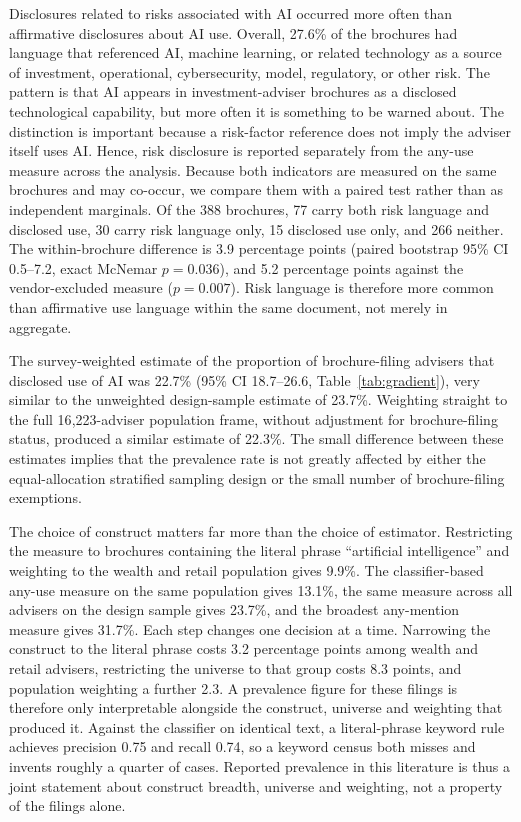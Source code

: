 \documentclass[utf8]{FrontiersinHarvard}
\begin{document}
Disclosures related to risks associated with AI occurred more often than affirmative disclosures about AI use. Overall, 27.6\% of the brochures had language that referenced AI, machine learning, or related technology as a source of investment, operational, cybersecurity, model, regulatory, or other risk. The pattern is that AI appears in investment-adviser brochures as a disclosed technological capability, but more often it is something to be warned about. The distinction is important because a risk-factor reference does not imply the adviser itself uses AI. Hence, risk disclosure is reported separately from the any-use measure across the analysis. Because both indicators are measured on the same brochures and may co-occur, we compare them with a paired test rather than as independent marginals. Of the 388 brochures, 77 carry both risk language and disclosed use, 30 carry risk language only, 15 disclosed use only, and 266 neither. The within-brochure difference is 3.9 percentage points (paired bootstrap 95\% CI 0.5--7.2, exact McNemar $p = 0.036$), and 5.2 percentage points against the vendor-excluded measure ($p = 0.007$). Risk language is therefore more common than affirmative use language within the same document, not merely in aggregate.

The survey-weighted estimate of the proportion of brochure-filing advisers that disclosed use of AI was 22.7\% (95\% CI 18.7--26.6, Table~\ref{tab:gradient}), very similar to the unweighted design-sample estimate of 23.7\%. Weighting straight to the full 16{,}223-adviser population frame, without adjustment for brochure-filing status, produced a similar estimate of 22.3\%. The small difference between these estimates implies that the prevalence rate is not greatly affected by either the equal-allocation stratified sampling design or the small number of brochure-filing exemptions.

The choice of construct matters far more than the choice of estimator. Restricting the measure to brochures containing the literal phrase ``artificial intelligence'' and weighting to the wealth and retail population gives 9.9\%. The classifier-based any-use measure on the same population gives 13.1\%, the same measure across all advisers on the design sample gives 23.7\%, and the broadest any-mention measure gives 31.7\%. Each step changes one decision at a time. Narrowing the construct to the literal phrase costs 3.2 percentage points among wealth and retail advisers, restricting the universe to that group costs 8.3 points, and population weighting a further 2.3. A prevalence figure for these filings is therefore only interpretable alongside the construct, universe and weighting that produced it. Against the classifier on identical text, a literal-phrase keyword rule achieves precision 0.75 and recall 0.74, so a keyword census both misses and invents roughly a quarter of cases. Reported prevalence in this literature is thus a joint statement about construct breadth, universe and weighting, not a property of the filings alone.
\end{document}
